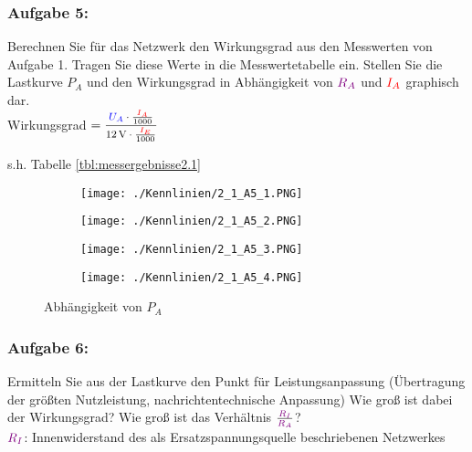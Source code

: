 \documentclass[a4paper,titlepage,parskip]{scrreprt}
\newcommand{\spannung}[1]{\textcolor{blue}{#1}}
\newcommand{\strom}[1]{\textcolor{red}{#1}}
\newcommand{\widerstand}[1]{\textcolor{violet}{#1}}
\begin{document}
           \subsubsection{Aufgabe 5:} Berechnen Sie für das Netzwerk den Wirkungsgrad aus den Messwerten von Aufgabe 1. Tragen Sie diese Werte in die Messwertetabelle ein. Stellen Sie die Lastkurve $P_A$ und den Wirkungsgrad in Abhängigkeit von $\widerstand{R_A}$ und $\strom{I_A}$ graphisch dar.\\
           Wirkungsgrad $=\mfrac{\spannung{U_A} \cdot \frac{\strom{I_A}}{1000}}{\SI{12}{\volt} \cdot \frac{\strom{I_E}}{1000}}$
           
           s.h. Tabelle \ref{tbl:messergebnisse2.1}

             \begin{figure}[!htbp]
                 \centering
                 \begin{subfigure}[b]{0.4\textwidth}
                     \centering
                     \texttt{[image: ./Kennlinien/2\_1\_A5\_1.PNG]}
                    \end{subfigure}%
                    \quad
                    \begin{subfigure}[b]{0.4\textwidth}
                        \centering
                        \texttt{[image: ./Kennlinien/2\_1\_A5\_2.PNG]}
                    \end{subfigure}
                    \begin{subfigure}[b]{0.4\textwidth}
                        \centering
                        \texttt{[image: ./Kennlinien/2\_1\_A5\_3.PNG]}
                    \end{subfigure}
                    \quad
                    \begin{subfigure}[b]{0.4\textwidth}
                        \centering
                        \texttt{[image: ./Kennlinien/2\_1\_A5\_4.PNG]}
                    \end{subfigure}
                    \caption{Abhängigkeit von $P_A$}\label{fig:beide-Bilder}
                \end{figure}

           \pagebreak
           \subsubsection{Aufgabe 6:} Ermitteln Sie aus der Lastkurve den Punkt für Leistungsanpassung (Übertragung der größten Nutzleistung, nachrichtentechnische Anpassung) Wie groß ist dabei der Wirkungsgrad? Wie groß ist das Verhältnis $\frac{\widerstand{R_I}}{\widerstand{R_A}}$?\\
           $\widerstand{R_I}$: Innenwiderstand des als Ersatzspannungsquelle beschriebenen Netzwerkes
           
\end{document}
